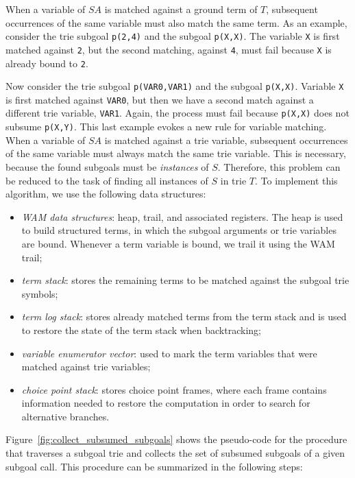 When a variable of $SA$ is matched against a ground term of $T$,
subsequent occurrences of the same variable must also match the same
term. As an example, consider the trie subgoal \texttt{p(2,4)} and the
subgoal \texttt{p(X,X)}. The variable \texttt{X} is first matched against
\texttt{2}, but the second matching, against \texttt{4}, must fail because
\texttt{X} is already bound to \texttt{2}.

Now consider the trie subgoal \texttt{p(VAR0,VAR1)} and the subgoal
\texttt{p(X,X)}. Variable \texttt{X} is first matched against \texttt{VAR0}, but then we
have a second match against a different trie variable, \texttt{VAR1}. Again,
the process must fail because \texttt{p(X,X)} does not subsume \texttt{p(X,Y)}. This
last example evokes a new rule for variable matching. When a variable
of $SA$ is matched against a trie variable, subsequent occurrences of
the same variable must always match the same trie variable. This is
necessary, because the found subgoals must be \emph{instances} of
$S$. Therefore, this problem can be reduced to the task of finding all
instances of $S$ in trie $T$. To implement this algorithm, we use the
following data structures:

\begin{itemize}
\item \textit{WAM data structures}: heap, trail, and associated
  registers. The heap is used to build structured terms, in which the
  subgoal arguments or trie variables are bound. Whenever a term
  variable is bound, we trail it using the WAM trail;
\item \textit{term stack}: stores the remaining terms to be matched
  against the subgoal trie symbols;
\item \textit{term log stack}: stores already matched terms from the
  term stack and is used to restore the state of the term stack when
  backtracking;
\item \textit{variable enumerator vector}: used to mark the term
  variables that were matched against trie variables;
\item \textit{choice point stack}: stores choice point frames, where
  each frame contains information needed to restore the computation in
  order to search for alternative branches.
\end{itemize}

Figure~\ref{fig:collect_subsumed_subgoals} shows the pseudo-code for
the procedure that traverses a subgoal trie and collects the set of
subsumed subgoals of a given subgoal call. This procedure can be
summarized in the following steps:

